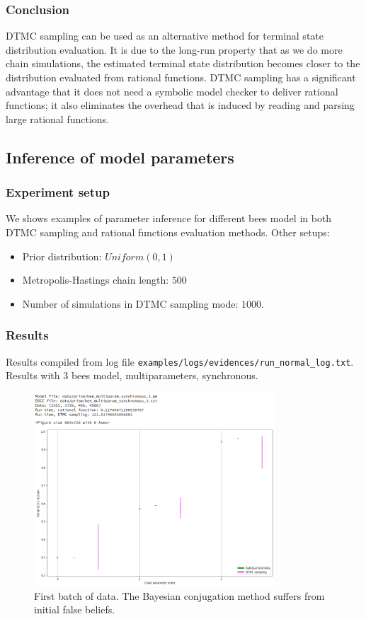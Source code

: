 \documentclass[12pt]{article}
\theoremstyle{definition}
\begin{document}
\subsubsection{Conclusion}
DTMC sampling can be used as an alternative method for terminal state
distribution evaluation. It is due to the long-run property that as we do more
chain simulations, the estimated terminal state distribution becomes closer to
the distribution evaluated from rational functions. DTMC sampling has a
significant advantage that it does not need a symbolic model checker to deliver
rational functions; it also eliminates the overhead that is induced by reading
and parsing large rational functions.


\subsection{Inference of model parameters}
\subsubsection{Experiment setup}
We shows examples of parameter inference for different bees model in both DTMC
sampling and rational functions evaluation methods. Other setups:
\begin{itemize}
\item Prior distribution: $Uniform(0, 1)$
\item Metropolis-Hastings chain length: $500$
\item Number of simulations in DTMC sampling mode: $1000$.
\end{itemize}

\subsubsection{Results}
Results compiled from log file \texttt{examples/logs/evidences/run\_normal\_log.txt}.\\
Results with 3 bees model, multiparameters, synchronous.
\begin{figure}[H]
  \centering
  \includegraphics[width=0.8\textwidth,keepaspectratio]{figures/normal_3.png}
  \caption{First batch of data. The Bayesian conjugation method suffers from
    initial false beliefs.}
\end{figure}
\end{document}
